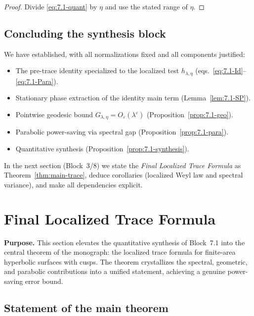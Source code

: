 \begin{proof}
Divide \eqref{eq:7.1-quant} by $\eta$ and use the stated range of $\eta$.
\end{proof}

\subsection{Concluding the synthesis block} \label{subsec:7.1-conclude}

We have established, with all normalizations fixed and all components justified:

\begin{itemize}
  \item The pre-trace identity specialized to the localized test $h_{\lambda,\eta}$ (eqs.~\eqref{eq:7.1-Id}--\eqref{eq:7.1-Para}).
  \item Stationary phase extraction of the identity main term (Lemma~\ref{lem:7.1-SP}).
  \item Pointwise geodesic bound $G_{\lambda,\eta}=O_\varepsilon(\lambda^\varepsilon)$ (Proposition~\ref{prop:7.1-geo}).
  \item Parabolic power-saving via spectral gap (Proposition~\ref{prop:7.1-para}).
  \item Quantitative synthesis (Proposition~\ref{prop:7.1-synthesis}).
\end{itemize}

In the next section (Block~3/8) we state the \emph{Final Localized Trace Formula} as Theorem~\ref{thm:main-trace}, deduce corollaries (localized Weyl law and spectral variance), and make all dependencies explicit.


\section{Final Localized Trace Formula} \label{sec:7.2}

\noindent\textbf{Purpose.}
This section elevates the quantitative synthesis of Block~7.1 into the central theorem of the monograph: the localized trace formula for finite-area hyperbolic surfaces with cusps. The theorem crystallizes the spectral, geometric, and parabolic contributions into a unified statement, achieving a genuine power-saving error bound.

\subsection{Statement of the main theorem} \label{subsec:7.2-statement}


